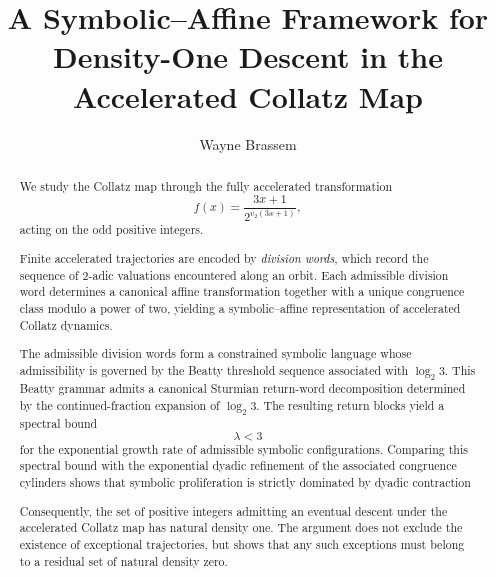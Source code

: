 \documentclass[12pt, oneside]{article}
\title{A Symbolic--Affine Framework for Density-One Descent in the Accelerated Collatz Map}
\author{Wayne Brassem}
\numberwithin{equation}{section}
\theoremstyle{definition}
\theoremstyle{plain}
\theoremstyle{remark}
\begin{document}
\newcommand{\chead}[1]{\multicolumn{1}{c}{#1}}


\maketitle

\begin{abstract}

We study the Collatz map through the fully accelerated transformation
\[
f(x)=\frac{3x+1}{2^{v_2(3x+1)}},
\]
acting on the odd positive integers.

Finite accelerated trajectories are encoded by \emph{division words},
which record the sequence of 2-adic valuations encountered along an orbit.
Each admissible division word determines a canonical affine transformation
together with a unique congruence class modulo a power of two, yielding a
symbolic--affine representation of accelerated Collatz dynamics.

The admissible division words form a constrained symbolic language whose
admissibility is governed by the Beatty threshold sequence associated with
\(\log_2 3\). This Beatty grammar admits a canonical Sturmian return-word
decomposition determined by the continued-fraction expansion of \(\log_2 3\).
The resulting return blocks yield a spectral bound
\[
\lambda<3
\]
for the exponential growth rate of admissible symbolic configurations.
Comparing this spectral bound with the exponential dyadic refinement of the
associated congruence cylinders shows that symbolic proliferation is strictly
dominated by dyadic contraction

Consequently, the set of positive integers admitting an eventual descent
under the accelerated Collatz map has natural density one. The argument
does not exclude the existence of exceptional trajectories, but shows that
any such exceptions must belong to a residual set of natural density zero.

\end{abstract}
\end{document}
